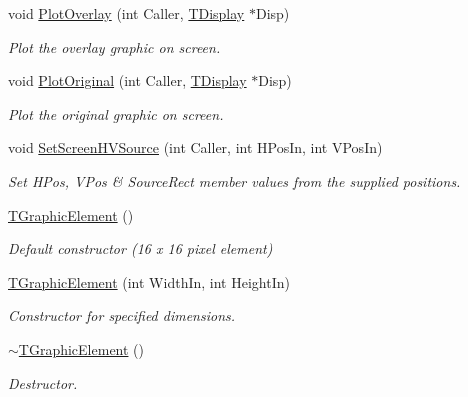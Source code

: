 \begin{DoxyCompactItemize}
\mbox{\label{class_t_graphic_element_a04ccc26451ff7d95dc3c5951b71f421e}} 
void \mbox{\hyperlink{class_t_graphic_element_a04ccc26451ff7d95dc3c5951b71f421e}{Plot\+Overlay}} (int Caller, \mbox{\hyperlink{class_t_display}{T\+Display}} $\ast$Disp)
\begin{DoxyCompactList}\small\item\em Plot the overlay graphic on screen. \end{DoxyCompactList}\item 
\mbox{\label{class_t_graphic_element_ad9e23ba031b1110126227d301b59ffc7}} 
void \mbox{\hyperlink{class_t_graphic_element_ad9e23ba031b1110126227d301b59ffc7}{Plot\+Original}} (int Caller, \mbox{\hyperlink{class_t_display}{T\+Display}} $\ast$Disp)
\begin{DoxyCompactList}\small\item\em Plot the original graphic on screen. \end{DoxyCompactList}\item 
\mbox{\label{class_t_graphic_element_afbfce56e5041fa0ac49b3ba49f7566fd}} 
void \mbox{\hyperlink{class_t_graphic_element_afbfce56e5041fa0ac49b3ba49f7566fd}{Set\+Screen\+H\+V\+Source}} (int Caller, int H\+Pos\+In, int V\+Pos\+In)
\begin{DoxyCompactList}\small\item\em Set H\+Pos, V\+Pos \& Source\+Rect member values from the supplied positions. \end{DoxyCompactList}\item 
\mbox{\label{class_t_graphic_element_a037be3b14fb32ebac36bbee7b76a6fc1}} 
\mbox{\hyperlink{class_t_graphic_element_a037be3b14fb32ebac36bbee7b76a6fc1}{T\+Graphic\+Element}} ()
\begin{DoxyCompactList}\small\item\em Default constructor (16 x 16 pixel element) \end{DoxyCompactList}\item 
\mbox{\label{class_t_graphic_element_a3d9336aecdb5c05c0d96485d896c8d24}} 
\mbox{\hyperlink{class_t_graphic_element_a3d9336aecdb5c05c0d96485d896c8d24}{T\+Graphic\+Element}} (int Width\+In, int Height\+In)
\begin{DoxyCompactList}\small\item\em Constructor for specified dimensions. \end{DoxyCompactList}\item 
\mbox{\label{class_t_graphic_element_af7a475400bc15a5ab41bf1b3d345dc31}} 
\mbox{\hyperlink{class_t_graphic_element_af7a475400bc15a5ab41bf1b3d345dc31}{$\sim$\+T\+Graphic\+Element}} ()
\begin{DoxyCompactList}\small\item\em Destructor. \end{DoxyCompactList}\end{DoxyCompactItemize}
